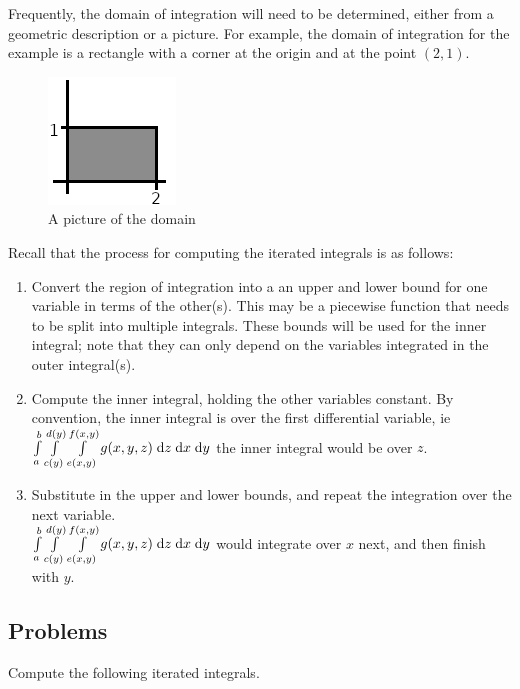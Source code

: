 \documentclass[letterpaper,11pt]{article}
\begin{document}
  Frequently, the domain of integration will need to be determined, either from a geometric description or a picture.
  For example, the domain of integration for the example is a rectangle with a corner at the origin and at the point $(2, 1)$.
  \begin{figure}[h]
    \centering \includegraphics{mech222/worksheet_1a_example_domain.png}
    \caption{A picture of the domain}
  \end{figure}
  Recall that the process for computing the iterated integrals is as follows:
  \begin{enumerate}
    \item Convert the region of integration into a an upper and lower bound for one variable in terms of the other(s).
      This may be a piecewise function that needs to be split into multiple integrals.
      These bounds will be used for the inner integral; note that they can only depend on the variables integrated in the outer integral(s).
    \item Compute the inner integral, holding the other variables constant.
      By convention, the inner integral is over the first differential variable, ie
      $\int \limits_{a}^{b} \int \limits_{c(y)}^{d(y)} \int \limits_{e(x, y)}^{f(x, y)} g(x, y, z) \;\mathrm{d}z \;\mathrm{d}x \;\mathrm{d}y$
      the inner integral would be over $z$.
    \item Substitute in the upper and lower bounds, and repeat the integration over the next variable.\\
      $\int \limits_{a}^{b} \int \limits_{c(y)}^{d(y)} \int \limits_{e(x, y)}^{f(x, y)} g(x, y, z) \;\mathrm{d}z \;\mathrm{d}x \;\mathrm{d}y$
      would integrate over $x$ next, and then finish with $y$.
  \end{enumerate}
  \subsection*{Problems}
  Compute the following iterated integrals.
\end{document}
